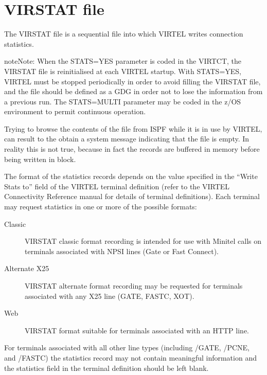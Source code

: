 \documentclass[letterpaper,10pt,english]{sphinxmanual}
\begin{document}
\section{VIRSTAT file}
\label{\detokenize{audit_operations_ and_performance:virstat-file}}\label{\detokenize{audit_operations_ and_performance:index-83}}
The VIRSTAT file is a sequential file into which VIRTEL writes connection statistics.

\begin{sphinxadmonition}{note}{Note:}
When the STATS=YES parameter is coded in the VIRTCT, the VIRSTAT file is reinitialised at each VIRTEL startup. With STATS=YES, VIRTEL must be stopped periodically in order to avoid filling the VIRSTAT
file, and the file should be defined as a GDG in order not to lose the information from a previous run. The STATS=MULTI parameter may be coded in the z/OS environment to permit continuous operation.

Trying to browse the contents of the file from ISPF while it is in use by VIRTEL, can result to the obtain a system message indicating that the file is empty. In reality this is not true, because in fact
the records are buffered in memory before being written in block.
\end{sphinxadmonition}

The format of the statistics records depends on the value specified in the “Write Stats to” field of the VIRTEL terminal definition (refer to the VIRTEL Connectivity Reference manual for details of terminal definitions). Each terminal may request statistics in one or more of the possible formats:
\begin{description}
\item[{Classic}] \leavevmode
VIRSTAT classic format recording is intended for use with Minitel calls on terminals associated with NPSI lines (Gate or Fast Connect).

\item[{Alternate X25}] \leavevmode
VIRSTAT alternate format recording may be requested for terminals associated with any X25 line (GATE, FASTC, XOT).

\item[{Web}] \leavevmode
VIRSTAT format suitable for terminals associated with an HTTP line.

\end{description}

For terminals associated with all other line types (including /GATE, /PCNE, and /FASTC) the statistics record may not contain meaningful information and the statistics field in the terminal definition     should be left blank.
\end{document}
